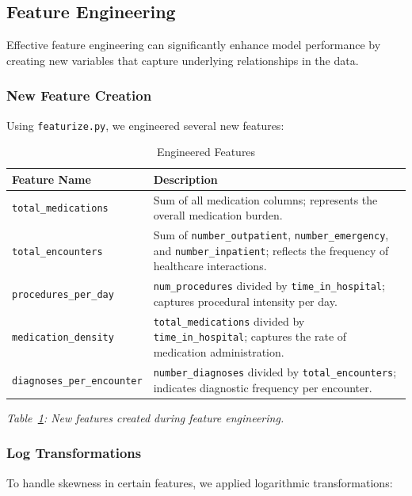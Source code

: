 \documentclass{article}
\begin{document}
\subsection{Feature Engineering}

Effective feature engineering can significantly enhance model performance by creating new variables that capture underlying relationships in the data.

\subsubsection{New Feature Creation}

Using \texttt{featurize.py}, we engineered several new features:

\begin{table}[H]
\centering
\caption{Engineered Features}\label{tab:engineered_features}
\begin{tabular}{p{4cm} p{10cm}}
\toprule
\textbf{Feature Name} & \textbf{Description} \\
\midrule
\texttt{total\_medications} & Sum of all medication columns; represents the overall medication burden. \\
\texttt{total\_encounters} & Sum of \texttt{number\_outpatient}, \texttt{number\_emergency}, and \texttt{number\_inpatient}; reflects the frequency of healthcare interactions. \\
\texttt{procedures\_per\_day} & \texttt{num\_procedures} divided by \texttt{time\_in\_hospital}; captures procedural intensity per day. \\
\texttt{medication\_density} & \texttt{total\_medications} divided by \texttt{time\_in\_hospital}; captures the rate of medication administration. \\
\texttt{diagnoses\_per\_encounter} & \texttt{number\_diagnoses} divided by \texttt{total\_encounters}; indicates diagnostic frequency per encounter. \\
\bottomrule
\end{tabular}
\end{table}

\textit{Table~\ref{tab:engineered_features}: New features created during feature engineering.}

\subsubsection{Log Transformations}

To handle skewness in certain features, we applied logarithmic transformations:
\end{document}
